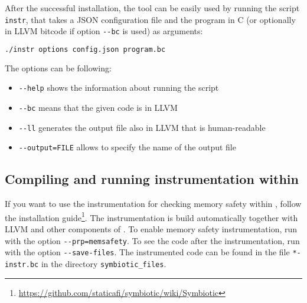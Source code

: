 \noindent After the successful installation, the tool can be easily used by
running the script \texttt{instr}, that takes a JSON configuration file and the
program in C (or optionally in LLVM bitcode if option \texttt{-{}-bc} is used)
as arguments:

\begin{lstlisting}[language=bash]
./instr options config.json program.bc
\end{lstlisting}

\newpage
\noindent The options can be following:
\begin{itemize}
  \item \texttt{-{}-help} shows the information about running the script
  \item \texttt{-{}-bc} means that the given code is in LLVM
  \item \texttt{-{}-ll} generates the output file also in LLVM that is human-readable
  \item \texttt{-{}-output=FILE} allows to specify the name of the output file
\end{itemize}

\subsection{Compiling and running instrumentation within \symbiotic}

If you want to use the instrumentation for checking memory safety within
\symbiotic, follow the \symbiotic installation
guide\footnote{\url{https://github.com/staticafi/symbiotic/wiki/Symbiotic}}.
The instrumentation is build automatically together with LLVM and other
components of \symbiotic. To enable memory safety instrumentation, run
\symbiotic with the option \texttt{-{}-prp=memsafety}. To see the code after
the instrumentation, run \symbiotic with the option \texttt{-{}-save-files}.
The instrumented code can be found in the file \texttt{*-instr.bc}
in the directory \texttt{symbiotic\_files}.


